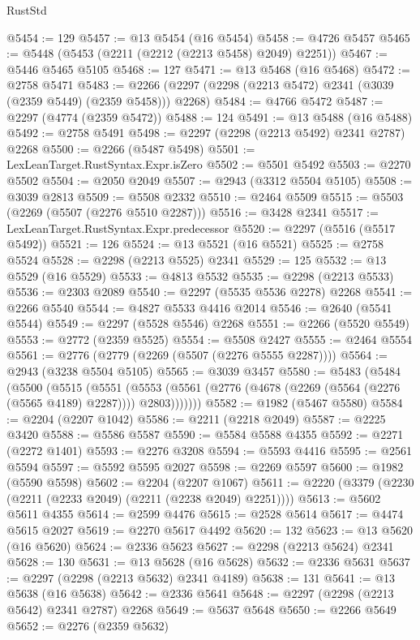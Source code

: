 \begin{lexlean}{RustStd}
\begin{coremodule}
@5454 := 129
@5457 := @13 @5454 (@16 @5454)
@5458 := @4726 @5457
@5465 := @5448 (@5453 (@2211 (@2212 (@2213 @5458) @2049) @2251))
@5467 := @5446 @5465 @5105
@5468 := 127
@5471 := @13 @5468 (@16 @5468)
@5472 := @2758 @5471
@5483 := @2266 (@2297 (@2298 (@2213 @5472) @2341 (@3039 (@2359 @5449) (@2359 @5458))) @2268)
@5484 := @4766 @5472
@5487 := @2297 (@4774 (@2359 @5472))
@5488 := 124
@5491 := @13 @5488 (@16 @5488)
@5492 := @2758 @5491
@5498 := @2297 (@2298 (@2213 @5492) @2341 @2787) @2268
@5500 := @2266 (@5487 @5498)
@5501 := LexLeanTarget.RustSyntax.Expr.isZero
@5502 := @5501 @5492
@5503 := @2270 @5502
@5504 := @2050 @2049
@5507 := @2943 (@3312 @5504 @5105)
@5508 := @3039 @2813
@5509 := @5508 @2332
@5510 := @2464 @5509
@5515 := @5503 (@2269 (@5507 (@2276 @5510 @2287)))
@5516 := @3428 @2341
@5517 := LexLeanTarget.RustSyntax.Expr.predecessor
@5520 := @2297 (@5516 (@5517 @5492))
@5521 := 126
@5524 := @13 @5521 (@16 @5521)
@5525 := @2758 @5524
@5528 := @2298 (@2213 @5525) @2341
@5529 := 125
@5532 := @13 @5529 (@16 @5529)
@5533 := @4813 @5532
@5535 := @2298 (@2213 @5533)
@5536 := @2303 @2089
@5540 := @2297 (@5535 @5536 @2278) @2268
@5541 := @2266 @5540
@5544 := @4827 @5533 @4416 @2014
@5546 := @2640 (@5541 @5544)
@5549 := @2297 (@5528 @5546) @2268
@5551 := @2266 (@5520 @5549)
@5553 := @2772 (@2359 @5525)
@5554 := @5508 @2427
@5555 := @2464 @5554
@5561 := @2776 (@2779 (@2269 (@5507 (@2276 @5555 @2287))))
@5564 := @2943 (@3238 @5504 @5105)
@5565 := @3039 @3457
@5580 := @5483
    (@5484
      (@5500
        (@5515
          (@5551
            (@5553 (@5561 (@2776 (@4678 (@2269 (@5564 (@2276 (@5565 @4189) @2287)))) @2803)))))))
@5582 := @1982 (@5467 @5580)
@5584 := @2204 (@2207 @1042)
@5586 := @2211 (@2218 @2049)
@5587 := @2225 @3420
@5588 := @5586 @5587
@5590 := @5584 @5588 @4355
@5592 := @2271 (@2272 @1401)
@5593 := @2276 @3208
@5594 := @5593 @4416
@5595 := @2561 @5594
@5597 := @5592 @5595 @2027
@5598 := @2269 @5597
@5600 := @1982 (@5590 @5598)
@5602 := @2204 (@2207 @1067)
@5611 := @2220 (@3379 (@2230 (@2211 (@2233 @2049) (@2211 (@2238 @2049) @2251))))
@5613 := @5602 @5611 @4355
@5614 := @2599 @4476
@5615 := @2528 @5614
@5617 := @4474 @5615 @2027
@5619 := @2270 @5617 @4492
@5620 := 132
@5623 := @13 @5620 (@16 @5620)
@5624 := @2336 @5623
@5627 := @2298 (@2213 @5624) @2341
@5628 := 130
@5631 := @13 @5628 (@16 @5628)
@5632 := @2336 @5631
@5637 := @2297 (@2298 (@2213 @5632) @2341 @4189)
@5638 := 131
@5641 := @13 @5638 (@16 @5638)
@5642 := @2336 @5641
@5648 := @2297 (@2298 (@2213 @5642) @2341 @2787) @2268
@5649 := @5637 @5648
@5650 := @2266 @5649
@5652 := @2276 (@2359 @5632)

\end{coremodule}
\end{lexlean}
